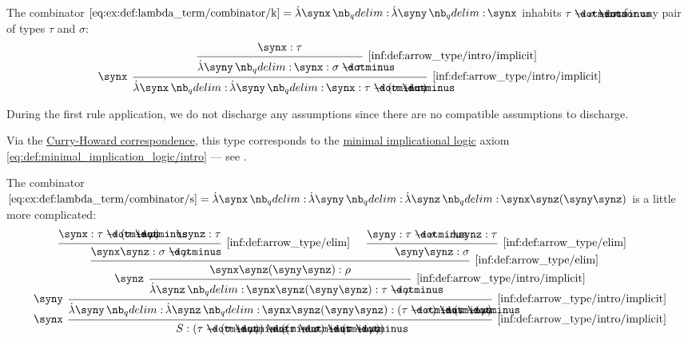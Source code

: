 \begin{example}
\begin{thmenum}
     The combinator \( \ref{eq:ex:def:lambda_term/combinator/k} = \qabs \synx \qabs \syny \synx \) inhabits \( \tau \synimplies \sigma \synimplies \tau \) for any pair of types \( \tau \) and \( \sigma \):
    \begin{equation*}
      \begin{prooftree}
        \hypo{ \synx: \tau }
        \infer1[\ref{inf:def:arrow_type/intro/implicit}]{ \qabs \syny \synx: \sigma \synimplies \tau }
        \infer[left label=\( \synx \)]1[\ref{inf:def:arrow_type/intro/implicit}]{ \qabs \synx \qabs \syny \synx: \tau \synimplies (\sigma \synimplies \tau) }
      \end{prooftree}
    \end{equation*}

    During the first rule application, we do not discharge any assumptions since there are no compatible assumptions to discharge.

    Via the \hyperref[con:curry_howard_correspondence]{Curry-Howard correspondence}, this type corresponds to the \hyperref[def:minimal_implication_logic]{minimal implicational logic} axiom \eqref{eq:def:minimal_implication_logic/intro} --- see .

     The combinator \( \ref{eq:ex:def:lambda_term/combinator/s} = \qabs \synx \qabs \syny \qabs \synz \synx \synz (\syny \synz) \) is a little more complicated:
    \begin{equation*}
      \begin{prooftree}
        \hypo{ \synx: \tau \synimplies (\sigma \synimplies \rho) }
        \hypo{ \synz: \tau }
        \infer2[\ref{inf:def:arrow_type/elim}]{ \synx \synz: \sigma \synimplies \rho }

        \hypo{ \syny: \tau \synimplies \sigma }
        \hypo{ \synz: \tau }
        \infer2[\ref{inf:def:arrow_type/elim}]{ \syny \synz: \sigma }

        \infer2[\ref{inf:def:arrow_type/elim}]{ \synx \synz (\syny \synz): \rho }
        \infer[left label=\( \synz \)]1[\ref{inf:def:arrow_type/intro/implicit}]{ \qabs \synz \synx \synz (\syny \synz): \tau \synimplies \rho }
        \infer[left label=\( \syny \)]1[\ref{inf:def:arrow_type/intro/implicit}]{ \qabs \syny \qabs \synz \synx \synz (\syny \synz): (\tau \synimplies \sigma) \synimplies (\tau \synimplies \rho) }
        \infer[left label=\( \synx \)]1[\ref{inf:def:arrow_type/intro/implicit}]{ S: (\tau \synimplies (\sigma \synimplies \rho)) \synimplies ((\tau \synimplies \sigma) \synimplies (\tau \synimplies \rho)) }
      \end{prooftree}
    \end{equation*}


\end{thmenum}
\end{example}
